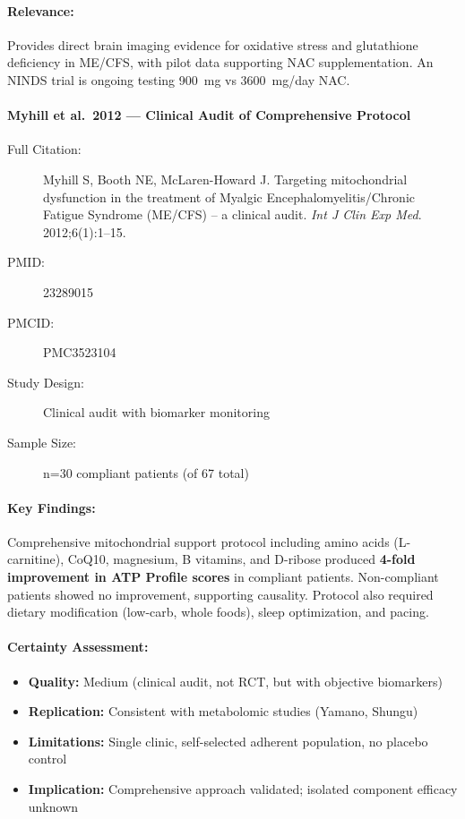 \paragraph{Relevance:}
Provides direct brain imaging evidence for oxidative stress and glutathione deficiency in ME/CFS, with pilot data supporting NAC supplementation. An NINDS trial is ongoing testing 900~mg vs 3600~mg/day NAC.

\paragraph{Myhill et al.\ 2012 --- Clinical Audit of Comprehensive Protocol}

\begin{description}
    \item[Full Citation:] Myhill S, Booth NE, McLaren-Howard J. Targeting mitochondrial dysfunction in the treatment of Myalgic Encephalomyelitis/Chronic Fatigue Syndrome (ME/CFS) -- a clinical audit. \textit{Int J Clin Exp Med}. 2012;6(1):1--15.
    \item[PMID:] 23289015
    \item[PMCID:] PMC3523104
    \item[Study Design:] Clinical audit with biomarker monitoring
    \item[Sample Size:] n=30 compliant patients (of 67 total)
\end{description}

\paragraph{Key Findings:}
Comprehensive mitochondrial support protocol including amino acids (L-carnitine), CoQ10, magnesium, B vitamins, and D-ribose produced \textbf{4-fold improvement in ATP Profile scores} in compliant patients. Non-compliant patients showed no improvement, supporting causality. Protocol also required dietary modification (low-carb, whole foods), sleep optimization, and pacing.

\paragraph{Certainty Assessment:}
\begin{itemize}
    \item \textbf{Quality:} Medium (clinical audit, not RCT, but with objective biomarkers)
    \item \textbf{Replication:} Consistent with metabolomic studies (Yamano, Shungu)
    \item \textbf{Limitations:} Single clinic, self-selected adherent population, no placebo control
    \item \textbf{Implication:} Comprehensive approach validated; isolated component efficacy unknown
\end{itemize}

